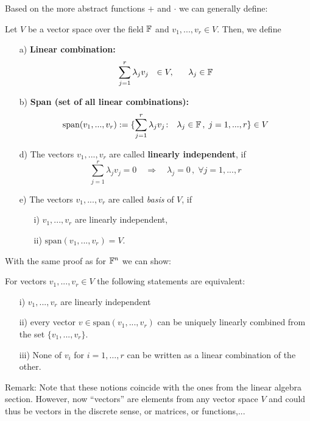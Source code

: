 \begin{frame}
Based on the more abstract functions $+$ and $\cdot$ we can generally define:
	\begin{definition} 
Let $V$ be a vector space over the field ${\mathbb{F}}$ and $v_1,...,v_r 
\in V$. Then, we define
\begin{itemize} 
\item[a)] \textbf{Linear combination:} 
$$
\sum^r_{j=1} \lambda_j v_j ~~\in V, ~~~~~\lambda _j \in {\mathbb{F}}
$$  
%
\item[b)] \textbf{Span (set of all linear combinations):} 
$$
\text{span}(v_1,...,v_r):= \{\sum^r_{j=1} \lambda_j v_j\colon ~~ \lambda_j \in {\mathbb{F}}\, , \; j=1,...,r\} \in V
$$ 
\item[d)] The vectors $v_1,...,v_r$ are called {\bf linearly independent}, if
$$ 
\sum^r_{j=1} \lambda_j v_j = 0 \quad\Rightarrow\quad \lambda_j = 0\, , \; \forall 
j=1,...,r
$$ 
\item[e)] The vectors $v_1,...,v_r$ are called \emph{basis} of $V$, 
if
\begin{itemize}
	\item[i)] $v_1,...,v_r$ are linearly independent,
	\item[ii)] $\text{span} (v_1,...,v_r) = V$. 
\end{itemize}
\end{itemize} 
\end{definition} 
With the same proof as for ${\mathbb{F}}^n$ we can show:
\begin{corollary} \label{kor4.8} 
	For vectors $v_1,...,v_r \in V$ the following statements are equivalent: 
	\begin{itemize} 
		\item[i)] $v_1,...,v_r$ are linearly independent 
		\item[ii)] every vector $v \in \text{span} (v_1,...,v_r)$ can be uniquely linearly combined from the set 
		$\{v_1,...,v_r\}$. 
		\item[iii)] None of $v_i$ for $ i = 1,\ldots,r$ can be written as a linear combination of the other. 
	\end{itemize} 
\end{corollary}
\footnotesize
Remark: Note that these notions coincide with the ones from the linear algebra section. However, now ``vectors'' are elements from any vector space $V$ and could thus be vectors in the discrete sense, or matrices, or functions,...
\end{frame}
 
